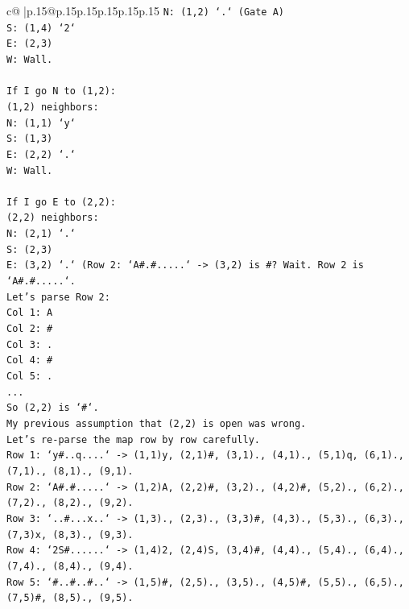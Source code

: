 \documentclass{article}
\begin{document}
{\begin{supertabular}{c@{$\;$}|p{.15\linewidth}@{}p{.15\linewidth}p{.15\linewidth}p{.15\linewidth}p{.15\linewidth}p{.15\linewidth}}
{{{\texttt{N: (1,2) `.` (Gate A)} \\
\texttt{S: (1,4) `2`} \\
\texttt{E: (2,3)} \\
\texttt{W: Wall.} \\
\\ 
\texttt{If I go N to (1,2):} \\
\texttt{(1,2) neighbors:} \\
\texttt{N: (1,1) `y`} \\
\texttt{S: (1,3)} \\
\texttt{E: (2,2) `.`} \\
\texttt{W: Wall.} \\
\\ 
\texttt{If I go E to (2,2):} \\
\texttt{(2,2) neighbors:} \\
\texttt{N: (2,1) `.`} \\
\texttt{S: (2,3)} \\
\texttt{E: (3,2) `.` (Row 2: `A\#.\#.....` {-}> (3,2) is \#? Wait. Row 2 is `A\#.\#.....`.} \\
\texttt{Let's parse Row 2:} \\
\texttt{Col 1: A} \\
\texttt{Col 2: \#} \\
\texttt{Col 3: .} \\
\texttt{Col 4: \#} \\
\texttt{Col 5: .} \\
\texttt{...} \\
\texttt{So (2,2) is `\#`.} \\
\texttt{My previous assumption that (2,2) is open was wrong.} \\
\texttt{Let's re{-}parse the map row by row carefully.} \\
\texttt{Row 1: `y\#..q....` {-}> (1,1)y, (2,1)\#, (3,1)., (4,1)., (5,1)q, (6,1)., (7,1)., (8,1)., (9,1).} \\
\texttt{Row 2: `A\#.\#.....` {-}> (1,2)A, (2,2)\#, (3,2)., (4,2)\#, (5,2)., (6,2)., (7,2)., (8,2)., (9,2).} \\
\texttt{Row 3: `..\#...x..` {-}> (1,3)., (2,3)., (3,3)\#, (4,3)., (5,3)., (6,3)., (7,3)x, (8,3)., (9,3).} \\
\texttt{Row 4: `2S\#......` {-}> (1,4)2, (2,4)S, (3,4)\#, (4,4)., (5,4)., (6,4)., (7,4)., (8,4)., (9,4).} \\
\texttt{Row 5: `\#..\#..\#..` {-}> (1,5)\#, (2,5)., (3,5)., (4,5)\#, (5,5)., (6,5)., (7,5)\#, (8,5)., (9,5).} \\
}}}
\end{supertabular}}
\end{document}
